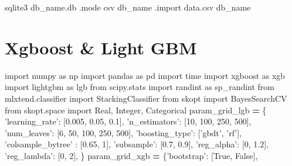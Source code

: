\documentclass[]{book}
\newenvironment{Shaded}{\begin{snugshade}}{\end{snugshade}}
\newcommand{\DecValTok}[1]{\textcolor[rgb]{0.00,0.00,0.81}{#1}}
\newcommand{\FloatTok}[1]{\textcolor[rgb]{0.00,0.00,0.81}{#1}}
\newcommand{\StringTok}[1]{\textcolor[rgb]{0.31,0.60,0.02}{#1}}
\newcommand{\ImportTok}[1]{#1}
\newcommand{\VariableTok}[1]{\textcolor[rgb]{0.00,0.00,0.00}{#1}}
\newcommand{\OperatorTok}[1]{\textcolor[rgb]{0.81,0.36,0.00}{\textbf{#1}}}
\newcommand{\ExtensionTok}[1]{#1}
\newcommand{\NormalTok}[1]{#1}
\begin{document}
\begin{Shaded}
\begin{Highlighting}[]
\ExtensionTok{sqlite3}\NormalTok{ db_name.db}
\ExtensionTok{.mode}\NormalTok{ csv db_name}
\ExtensionTok{.import}\NormalTok{ data.csv db_name}
\end{Highlighting}
\end{Shaded}

\section{Xgboost \& Light GBM}\label{xgboost-light-gbm}

\begin{Shaded}
\begin{Highlighting}[]
\ImportTok{import}\NormalTok{ numpy }\ImportTok{as}\NormalTok{ np}
\ImportTok{import}\NormalTok{ pandas }\ImportTok{as}\NormalTok{ pd}
\ImportTok{import}\NormalTok{ time}
\ImportTok{import}\NormalTok{ xgboost }\ImportTok{as}\NormalTok{ xgb}
\ImportTok{import}\NormalTok{ lightgbm }\ImportTok{as}\NormalTok{ lgb}
\ImportTok{from}\NormalTok{ scipy.stats }\ImportTok{import}\NormalTok{ randint }\ImportTok{as}\NormalTok{ sp_randint}
\ImportTok{from}\NormalTok{ mlxtend.classifier }\ImportTok{import}\NormalTok{ StackingClassifier}
\ImportTok{from}\NormalTok{ skopt }\ImportTok{import}\NormalTok{ BayesSearchCV}
\ImportTok{from}\NormalTok{ skopt.space }\ImportTok{import}\NormalTok{ Real, Integer, Categorical}
\NormalTok{param_grid_lgb }\OperatorTok{=}\NormalTok{ \{}
    \StringTok{'learning_rate'}\NormalTok{: [}\FloatTok{0.005}\NormalTok{, }\FloatTok{0.05}\NormalTok{, }\FloatTok{0.1}\NormalTok{], }\StringTok{'n_estimators'}\NormalTok{: [}\DecValTok{10}\NormalTok{, }\DecValTok{100}\NormalTok{, }\DecValTok{250}\NormalTok{, }\DecValTok{500}\NormalTok{],}
    \StringTok{'num_leaves'}\NormalTok{: [}\DecValTok{6}\NormalTok{, }\DecValTok{50}\NormalTok{, }\DecValTok{100}\NormalTok{, }\DecValTok{250}\NormalTok{, }\DecValTok{500}\NormalTok{], }\StringTok{'boosting_type'}\NormalTok{: [}\StringTok{'gbdt'}\NormalTok{, }\StringTok{'rf'}\NormalTok{],}
    \StringTok{'colsample_bytree'}\NormalTok{ : [}\FloatTok{0.65}\NormalTok{, }\DecValTok{1}\NormalTok{], }\StringTok{'subsample'}\NormalTok{: [}\FloatTok{0.7}\NormalTok{, }\FloatTok{0.9}\NormalTok{],}
    \StringTok{'reg_alpha'}\NormalTok{: [}\DecValTok{0}\NormalTok{, }\FloatTok{1.2}\NormalTok{], }\StringTok{'reg_lambda'}\NormalTok{: [}\DecValTok{0}\NormalTok{, }\DecValTok{2}\NormalTok{],}
\NormalTok{    \}}
\NormalTok{param_grid_xgb }\OperatorTok{=}\NormalTok{ \{}\StringTok{'bootstrap'}\NormalTok{: [}\VariableTok{True}\NormalTok{, }\VariableTok{False}\NormalTok{],}

\end{Highlighting}
\end{Shaded}
\end{document}
